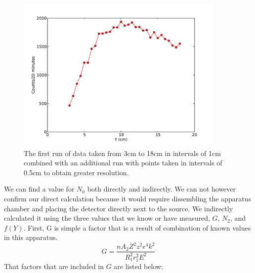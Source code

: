 \begin{figure}[H]
\begin{center}
\includegraphics[width=4in]{secondrun.pdf}
\caption{The first run of data taken from 3cm to 18cm in intervals of 1cm combined  with an additional run with points taken in intervals of 0.5cm to obtain greater resolution.}
\end{center}
\end{figure}

We can find a value for $N_0$ both directly and indirectly.  We can not however confirm our direct calculation because it would require dissembling the apparatus chamber and placing the detector directly next to the source. We indirectly calculated it using the three values that we know or have measured, $G$, $N_2$, and $f(Y)$. First, G is simple a factor that is a result of combination of known values in this apparatus. 
\begin{equation}G=\frac{nA_2Z^2z^2e^4k^2}{R_1^2r_1^2  E^2}\end{equation}
That factors that are included in $G$ are listed below:


